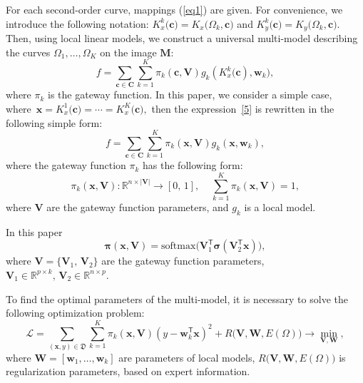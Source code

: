 \documentclass[12pt, twoside]{article}
\numberwithin{equation}{section}
\begin{document}
For each second-order curve, mappings (\ref{eq1}) are given. For convenience, we introduce the following notation: $K_x^k\bigr(\mathbf{c}\bigr) = K_x\bigr(\Omega_k, \mathbf{c}\bigr)$ and $K_y^k\bigr(\mathbf{c}\bigr) = K_y\bigr(\Omega_k, \mathbf{c}\bigr)$. Then, using local linear models, we construct a universal multi-model describing the curves $\Omega_1, \dots, \Omega_K$ on the image $\mathbf{M}$:
\begin{equation}
\label{5}
	f = \sum\limits_{\mathbf{c} \in \mathbf{C}} \sum_{k = 1}^{K} \pi_k(\mathbf{c}, \mathbf{V})g_k(K^k_{x}\bigl(\mathbf{c}), \mathbf{w}_k), 
\end{equation}
where $\pi_k$ is the  gateway function. In this paper, we consider a simple case, where~$\mathbf{x}=K^1_{x}\bigl(\mathbf{c})=\cdots=K^K_{x}\bigl(\mathbf{c}),$ then the expression~\eqref{5} is rewritten in the following simple form:
\begin{equation}
\label{5_1}
	f = \sum\limits_{\mathbf{c} \in \mathbf{C}} \sum_{k = 1}^{K} \pi_k(\mathbf{x}, \mathbf{V})g_k(\mathbf{x}, \mathbf{w}_k), 
\end{equation}
where the gateway function $\pi_k$ has the following form:
\begin{equation}
\label{6}
	\pi_k(\mathbf{x}, \mathbf{V}): \mathbb{R}^{n\times |\mathbf{V}|} \rightarrow [0, \, 1], \; \; \; \; \sum\limits_{k = 1}^{K}\pi_k(\mathbf{x}, \mathbf{V}) = 1,
\end{equation}
where $\mathbf{V}$ are the gateway function parameters, and $g_k$ is a local model.
    
In this paper
\begin{equation}
    \boldsymbol{\pi}(\mathbf{x}, \mathbf{V}) = \text{softmax}\bigl(\mathbf{V}_1^{\mathsf{T}}\boldsymbol{\sigma}(\mathbf{V}_2^{\mathsf{T}}\mathbf{x}) \bigr),
\end{equation}
where $\mathbf{V} = \{ \mathbf{V}_1, \, \mathbf{V}_2\}$ are the gateway function parameters,
$\mathbf{V}_1 \in \mathbb{R}^{p \times k}, \, \mathbf{V}_2 \in \mathbb{R}^{n \times p}$. 

To find the optimal parameters of the multi-model, it is necessary to solve the following optimization problem:
\begin{equation}\label{9}
\mathcal{L} = \sum\limits_{(\mathbf{x}, y) \in \mathfrak{D}} \sum\limits_{k = 1}^{K} \pi_k(\mathbf{x}, \mathbf{V})(y - \mathbf{w}_k^{\mathsf{T}}\mathbf{x})^2 + R\bigl(\mathbf{V}, \mathbf{W}, E(\Omega)\bigr) \rightarrow \min_{\mathbf{V}, \mathbf{W}},
\end{equation}
where $\mathbf{W} = [\mathbf{w}_1, \dots, \mathbf{w}_k]$ are  parameters of local models, $R\bigl(\mathbf{V}, \mathbf{W}, E(\Omega)\bigr)$ is regularization parameters, based on expert information.
\end{document}

